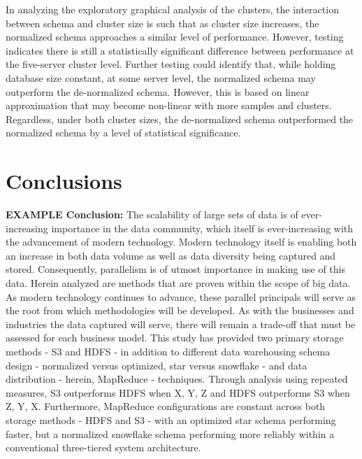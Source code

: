 \documentclass[journal]{IEEEtran}
\begin{document}
In analyzing the exploratory graphical analysis of the clusters, 
 the interaction between schema and cluster size is such that as cluster size increases,
 the normalized schema approaches a similar level of performance. 
However, testing indicates there is still a statistically significant difference between 
 performance at the five-server cluster level. 
Further testing could identify that, while holding database size constant, at some server level, 
 the normalized schema may outperform the de-normalized schema. 
However, this is based on linear approximation that may become non-linear with more samples and clusters. 
Regardless, under both cluster sizes,
 the de-normalized schema outperformed the normalized schema by a level of statistical significance.

\section{Conclusions}

\textbf{EXAMPLE Conclusion:}
The scalability of large sets of data is of ever-increasing importance in the data community, which itself is ever-increasing with the advancement of modern technology. Modern technology itself is enabling both an increase in both data volume as well as data diversity being captured and stored. Consequently, parallelism is of utmost importance in making use of this data. Herein analyzed are methods that are proven within the scope of big data. As modern technology continues to advance, these parallel principals will serve as the root from which methodologies will be developed. As with the businesses and industries the data captured will serve, there will remain a trade-off that must be assessed for each business model. This study has provided two primary storage methods - S3 and HDFS - in addition to different data warehousing schema design - normalized versus optimized, star versus snowflake - and data distribution - herein, MapReduce - techniques. Through analysis using repeated measures, S3 outperforms HDFS when X, Y, Z and HDFS outperforms S3 when Z, Y, X. Furthermore, MapReduce configurations are constant across both storage methods - HDFS and S3 - with an optimized star schema performing faster, but a normalized snowflake schema performing more reliably within a conventional three-tiered system architecture.

\ifCLASSOPTIONcaptionsoff
  \newpage
\fi
\end{document}
